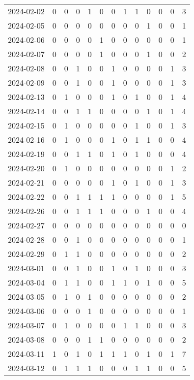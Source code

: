 \documentclass[dvipdfmx,oneside]{article}
\begin{document}
\begin{longtable}{lcccccccccccc}
2024-02-02 & 0 & 0 & 0 & 1 & 0 & 0 & 1 & 1 & 0 & 0 & 0 & 3 \\
2024-02-05 & 0 & 0 & 0 & 0 & 0 & 0 & 0 & 0 & 1 & 0 & 0 & 1 \\
2024-02-06 & 0 & 0 & 0 & 0 & 1 & 0 & 0 & 0 & 0 & 0 & 0 & 1 \\
2024-02-07 & 0 & 0 & 0 & 0 & 1 & 0 & 0 & 0 & 1 & 0 & 0 & 2 \\
2024-02-08 & 0 & 0 & 1 & 0 & 0 & 1 & 0 & 0 & 0 & 0 & 1 & 3 \\
2024-02-09 & 0 & 0 & 1 & 0 & 0 & 1 & 0 & 0 & 0 & 0 & 1 & 3 \\
2024-02-13 & 0 & 1 & 0 & 0 & 0 & 1 & 0 & 1 & 0 & 0 & 1 & 4 \\
2024-02-14 & 0 & 0 & 1 & 1 & 0 & 0 & 0 & 0 & 1 & 0 & 1 & 4 \\
2024-02-15 & 0 & 1 & 0 & 0 & 0 & 0 & 0 & 1 & 0 & 0 & 1 & 3 \\
2024-02-16 & 0 & 1 & 0 & 0 & 0 & 1 & 0 & 1 & 1 & 0 & 0 & 4 \\
2024-02-19 & 0 & 0 & 1 & 1 & 0 & 1 & 0 & 1 & 0 & 0 & 0 & 4 \\
2024-02-20 & 0 & 1 & 0 & 0 & 0 & 0 & 0 & 0 & 0 & 0 & 1 & 2 \\
2024-02-21 & 0 & 0 & 0 & 0 & 0 & 1 & 0 & 1 & 0 & 0 & 1 & 3 \\
2024-02-22 & 0 & 0 & 1 & 1 & 1 & 1 & 0 & 0 & 0 & 0 & 1 & 5 \\
2024-02-26 & 0 & 0 & 1 & 1 & 1 & 0 & 0 & 0 & 1 & 0 & 0 & 4 \\
2024-02-27 & 0 & 0 & 0 & 0 & 0 & 0 & 0 & 0 & 0 & 0 & 0 & 0 \\
2024-02-28 & 0 & 0 & 1 & 0 & 0 & 0 & 0 & 0 & 0 & 0 & 0 & 1 \\
2024-02-29 & 0 & 1 & 1 & 0 & 0 & 0 & 0 & 0 & 0 & 0 & 0 & 2 \\
2024-03-01 & 0 & 0 & 1 & 0 & 0 & 1 & 0 & 1 & 0 & 0 & 0 & 3 \\
2024-03-04 & 0 & 1 & 1 & 0 & 0 & 1 & 1 & 0 & 1 & 0 & 0 & 5 \\
2024-03-05 & 0 & 1 & 0 & 1 & 0 & 0 & 0 & 0 & 0 & 0 & 0 & 2 \\
2024-03-06 & 0 & 0 & 0 & 1 & 0 & 0 & 0 & 0 & 0 & 0 & 0 & 1 \\
2024-03-07 & 0 & 1 & 0 & 0 & 0 & 0 & 1 & 1 & 0 & 0 & 0 & 3 \\
2024-03-08 & 0 & 0 & 0 & 1 & 1 & 0 & 0 & 0 & 0 & 0 & 0 & 2 \\
2024-03-11 & 1 & 0 & 1 & 0 & 1 & 1 & 1 & 0 & 1 & 0 & 1 & 7 \\
2024-03-12 & 0 & 1 & 1 & 1 & 0 & 0 & 0 & 1 & 1 & 0 & 0 & 5 \\

\end{longtable}
\end{document}
